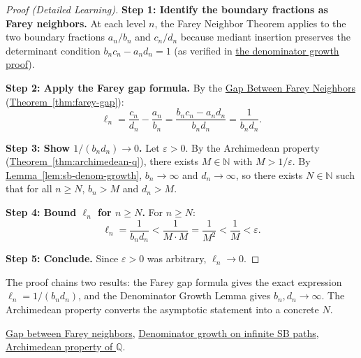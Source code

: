 \begin{proof}[Proof (Detailed Learning)]
\textbf{Step 1: Identify the boundary fractions as Farey neighbors.}
At each level $n$, the Farey Neighbor Theorem applies to the two boundary
fractions $a_n/b_n$ and $c_n/d_n$ because mediant insertion preserves
the determinant condition $b_n c_n - a_n d_n = 1$
(as verified in \hyperref[prf:sb-denom-growth]{the denominator growth proof}).

\textbf{Step 2: Apply the Farey gap formula.}
By the \hyperref[thm:farey-gap]{Gap Between Farey Neighbors}
(\hyperref[thm:farey-gap]{Theorem~\ref*{thm:farey-gap}}):
\[
\ell_n = \frac{c_n}{d_n} - \frac{a_n}{b_n} = \frac{b_n c_n - a_n d_n}{b_n d_n} = \frac{1}{b_n d_n}.
\]

\textbf{Step 3: Show $1/(b_n d_n) \to 0$.}
Let $\varepsilon > 0$.  By the Archimedean property
(\hyperref[thm:archimedean-q]{Theorem~\ref*{thm:archimedean-q}}),
there exists $M \in \mathbb{N}$ with $M > 1/\varepsilon$.  By
\hyperref[lem:sb-denom-growth]{Lemma~\ref*{lem:sb-denom-growth}},
$b_n \to \infty$ and $d_n \to \infty$, so there exists $N \in \mathbb{N}$
such that for all $n \geq N$, $b_n > M$ and $d_n > M$.

\textbf{Step 4: Bound $\ell_n$ for $n \geq N$.}
For $n \geq N$:
\[
\ell_n = \frac{1}{b_n d_n} < \frac{1}{M \cdot M} = \frac{1}{M^2} < \frac{1}{M} < \varepsilon.
\]

\textbf{Step 5: Conclude.}
Since $\varepsilon > 0$ was arbitrary, $\ell_n \to 0$.
\end{proof}

\begin{remark*}
The proof chains two results: the Farey gap formula gives the exact
expression $\ell_n = 1/(b_n d_n)$, and the Denominator Growth Lemma
gives $b_n, d_n \to \infty$.  The Archimedean property converts the
asymptotic statement into a concrete $N$.
\end{remark*}

\begin{dependencies}
\hyperref[thm:farey-gap]{Gap between Farey neighbors},
\hyperref[lem:sb-denom-growth]{Denominator growth on infinite SB paths},
\hyperref[thm:archimedean-q]{Archimedean property of $\mathbb{Q}$}.
\end{dependencies}
